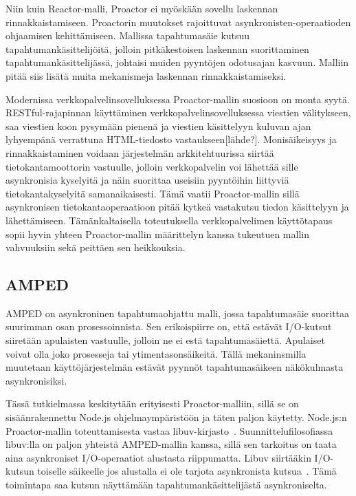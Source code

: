 \documentclass[finnish]{tktltiki2}
\theoremstyle{definition}
\theoremstyle{remark}
\begin{document}
Niin kuin Reactor-malli, Proactor ei myöskään sovellu laskennan rinnakkaistamiseen.
Proactorin muutokset rajoittuvat asynkronisten-operaatioden ohjaamisen
kehittämiseen. Mallissa tapahtumasäie kutsuu tapahtumankäsittelijöitä, jolloin
pitkäkestoisen laskennan suorittaminen tapahtumankäsittelijässä, johtaisi
muiden pyyntöjen odotusajan kasvuun. Malliin pitää siis
lisätä muita mekanismeja laskennan rinnakkaistamiseksi.

Modernissa verkkopalvelinsovelluksessa Proactor-mallin suosioon on
monta syytä. RESTful-rajapinnan käyttäminen
verkkopalvelinsovelluksessa viestien välitykseen,
saa viestien koon pysymään pienenä ja viestien
käsittelyyn kuluvan ajan lyhyempänä verrattuna
HTML-tiedosto vastaukseen[lähde?]. %
Monisäikeisyys ja rinnakkaistaminen
voidaan järjestelmän arkkitehtuurissa siirtää tietokantamoottorin vastuulle,
jolloin verkkopalvelin voi lähettää sille asynkronisia kyselyitä
ja näin suorittaa useisiin pyyntöihin liittyviä tietokantakyselyitä
samanaikaisesti. Tämä vaatii Proactor-mallin sillä asynkronisen tietokantaoperaatioon
pitää kytkeä vastakutsu tiedon käsittelyyn ja lähettämiseen.
Tämänkaltaisella toteutuksella verkkopalvelimen käyttötapaus sopii
hyvin yhteen Proactor-mallin määrittelyn kanssa tukeutuen
mallin vahvuuksiin sekä peittäen sen heikkouksia.

\subsection{AMPED}

AMPED on asynkroninen tapahtumaohjattu malli, jossa
tapahtumasäie suorittaa suurimman osan prosessoinnista. 
Sen erikoispiirre on, että estävät I/O-kutsut
siiretään apulaisten vastuulle, jolloin
ne ei estä tapahtumasäiettä. Apulaiset voivat
olla joko prosesseja tai ytimentasonsäikeitä.
Tällä mekaninsmilla muutetaan käyttöjärjestelmän
estävät pyynnöt tapahtumasäikeen näkökulmasta
asynkronisiksi.

Tässä tutkielmassa keskitytään erityisesti
Proactor-malliin, sillä se on sisäänrakennettu Node.js ohjelmaympäristöön ja
täten paljon käytetty. Node.js:n Proactor-mallin toteuttamisesta vastaa
libuv-kirjasto~\cite{libuv_design_2019}. Suunnittelufilosofiassa
libuv:lla on paljon yhteistä AMPED-mallin kanssa, sillä
sen tarkoitus on taata aina asynkroniset I/O-operaatiot alustasta
riippumatta. Libuv siirtääkin I/O-kutsun toiselle säikeelle
jos alustalla ei ole tarjota asynkronista kutsua~\cite{libuv_design_2019}.
Tämä toimintapa saa kutsun näyttämään tapahtumankäsittelijästä
asynkroniselta.
\end{document}
